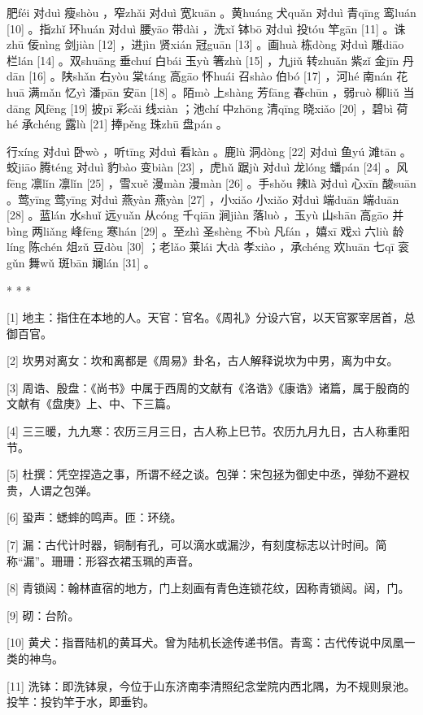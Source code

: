 \documentclass[12pt,UTF8]{ctexbook}
\begin{document}
肥féi 对duì 瘦shòu ，窄zhǎi 对duì 宽kuān 。黄huáng 犬quǎn 对duì 青qīng 鸾luán [10] 。指zhǐ 环huán 对duì 腰yāo 带dài ，洗xǐ 钵bō 对duì 投tóu 竿gān [11] 。诛zhū 佞nìng 剑jiàn [12] ，进jìn 贤xián 冠guān [13] 。画huà 栋dòng 对duì 雕diāo 栏lán [14] 。双shuāng 垂chuí 白bái 玉yù 箸zhù [15] ，九jiǔ 转zhuǎn 紫zǐ 金jīn 丹dān [16] 。陕shǎn 右yòu 棠táng 高gāo 怀huái 召shào 伯bó [17] ，河hé 南nán 花huā 满mǎn 忆yì 潘pān 安ān [18] 。陌mò 上shàng 芳fāng 春chūn ，弱ruò 柳liǔ 当dāng 风fēng [19] 披pī 彩cǎi 线xiàn ；池chí 中zhōng 清qīng 晓xiǎo [20] ，碧bì 荷hé 承chéng 露lù [21] 捧pěng 珠zhū 盘pán 。

行xíng 对duì 卧wò ，听tīng 对duì 看kàn 。鹿lù 洞dòng [22] 对duì 鱼yú 滩tān 。蛟jiāo 腾téng 对duì 豹bào 变biàn [23] ，虎hǔ 踞jù 对duì 龙lóng 蟠pán [24] 。风fēng 凛lǐn 凛lǐn [25] ，雪xuě 漫màn 漫màn [26] 。手shǒu 辣là 对duì 心xīn 酸suān 。莺yīng 莺yīng 对duì 燕yàn 燕yàn [27] ，小xiǎo 小xiǎo 对duì 端duān 端duān [28] 。蓝lán 水shuǐ 远yuǎn 从cóng 千qiān 涧jiàn 落luò ，玉yù 山shān 高gāo 并bìng 两liǎng 峰fēng 寒hán [29] 。至zhì 圣shèng 不bù 凡fán ，嬉xī 戏xì 六liù 龄líng 陈chén 俎zǔ 豆dòu [30] ；老lǎo 莱lái 大dà 孝xiào ，承chéng 欢huān 七qī 衮gǔn 舞wǔ 斑bān 斓lán [31] 。



* * *



[1] 地主：指住在本地的人。天官：官名。《周礼》分设六官，以天官冢宰居首，总御百官。

[2] 坎男对离女：坎和离都是《周易》卦名，古人解释说坎为中男，离为中女。

[3] 周诰、殷盘：《尚书》中属于西周的文献有《洛诰》《康诰》诸篇，属于殷商的文献有《盘庚》上、中、下三篇。

[4] 三三暖，九九寒：农历三月三日，古人称上巳节。农历九月九日，古人称重阳节。

[5] 杜撰：凭空捏造之事，所谓不经之谈。包弹：宋包拯为御史中丞，弹劾不避权贵，人谓之包弹。

[6] 蛩声：蟋蟀的鸣声。匝：环绕。

[7] 漏：古代计时器，铜制有孔，可以滴水或漏沙，有刻度标志以计时间。简称“漏”。珊珊：形容衣裙玉珮的声音。

[8] 青锁闼：翰林直宿的地方，门上刻画有青色连锁花纹，因称青锁闼。闼，门。

[9] 砌：台阶。

[10] 黄犬：指晋陆机的黄耳犬。曾为陆机长途传递书信。青鸾：古代传说中凤凰一类的神鸟。

[11] 洗钵：即洗钵泉，今位于山东济南李清照纪念堂院内西北隅，为不规则泉池。投竿：投钓竿于水，即垂钓。
\end{document}
